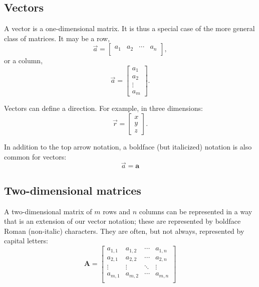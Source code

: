 \documentclass[a4paper,10pt]{scrartcl}
\begin{document}
\subsection{Vectors}

A vector is a one-dimensional matrix. It is thus a special case of the more general class of matrices. It may be a row,
\begin{equation}
\vec{a} =
 \begin{bmatrix}
  a_{1} & a_{2} & \cdots & a_{n} \\
 \end{bmatrix},
\end{equation}
or a column,
\begin{equation}
\vec{a} =
 \begin{bmatrix}
  a_{1} \\
  a_{2} \\
  \vdots \\
  a_{m}
 \end{bmatrix}.
\end{equation}

Vectors can define a direction. For example, in three dimensions:
\begin{equation}
\vec{r} =
 \begin{bmatrix}
  x \\
  y \\
  z
 \end{bmatrix}.
\end{equation}

In addition to the top arrow notation, a boldface (but italicized) notation is also common for vectors:
\begin{equation}
\vec{a} = \boldsymbol{a}
\end{equation}


\subsection{Two-dimensional matrices}

A two-dimensional matrix of $m$ rows and $n$ columns can be represented in a way that is an extension of our vector notation; these are represented by boldface Roman (non-italic) characters. They are often, but not always, represented by capital letters:
\begin{equation}
\mathbf{A} =
 \begin{bmatrix}
  a_{1,1} & a_{1,2} & \cdots & a_{1,n} \\
  a_{2,1} & a_{2,2} & \cdots & a_{2,n} \\
  \vdots & \vdots & \ddots & \vdots \\
  a_{m,1} & a_{m,2} & \cdots & a_{m,n} \\
 \end{bmatrix}
\end{equation}
\end{document}
